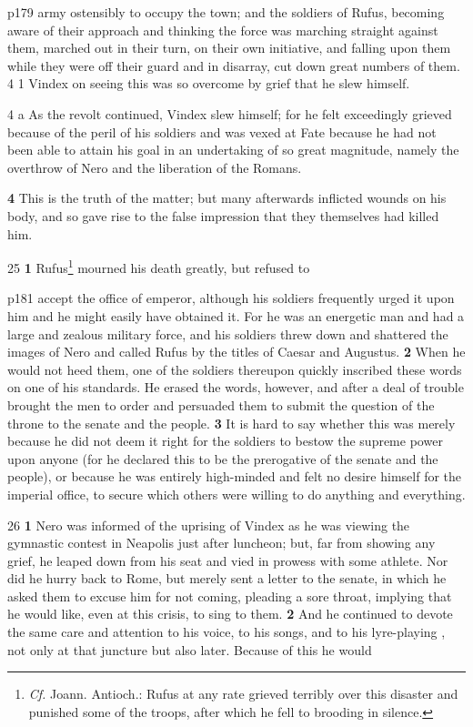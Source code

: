 p179 army ostensibly to occupy the town; and the soldiers of Rufus, becoming aware of their approach and thinking the force was marching straight against them, marched out in their turn, on their own initiative, and falling upon them while they were off their guard and in disarray, cut down great numbers of them. 4 1 Vindex on seeing this was so overcome by grief that he slew himself.

4 a As the revolt continued, Vindex slew himself; for he felt exceedingly grieved because of the peril of his soldiers and was vexed at Fate because he had not been able to attain his goal in an undertaking of so great magnitude, namely the overthrow of Nero and the liberation of the Romans.

\textbf{4} This is the truth of the matter; but many afterwards inflicted wounds on his body, and so gave rise to the false impression that they themselves had killed him.

25
\textbf{1} Rufus\texthebrew{⁠}\footnote{\emph{Cf.} Joann. Antioch.: Rufus at any rate grieved terribly over this disaster and punished some of the troops, after which he fell to brooding in silence.

} mourned his death greatly, but refused to

p181 accept the office of emperor, although his soldiers frequently urged it upon him and he might easily have obtained it. For he was an energetic man and had a large and zealous military force, and his soldiers threw down and shattered the images of Nero and called Rufus by the titles of Caesar and Augustus. \textbf{2} When he would not heed them, one of the soldiers thereupon quickly inscribed these words on one of his standards. He erased the words, however, and after a deal of trouble brought the men to order and persuaded them to submit the question of the throne to the senate and the people. \textbf{3} It is hard to say whether this was merely because he did not deem it right for the soldiers to bestow the supreme power upon anyone (for he declared this to be the prerogative of the senate and the people), or because he was entirely high-minded and felt no desire himself for the imperial office, to secure which others were willing to do anything and everything.

26
\textbf{1} Nero was informed of the uprising of Vindex as he was viewing the gymnastic contest in Neapolis just after luncheon; but, far from showing any grief, he leaped down from his seat and vied in prowess with some athlete. Nor did he hurry back to Rome, but merely sent a letter to the senate, in which he asked them to excuse him for not coming, pleading a sore throat, implying that he would like, even at this crisis, to sing to them. \textbf{2} And he continued to devote the same care and attention to his voice, to his songs, and to his lyre-playing , not only at that juncture but also later. Because of this he would

